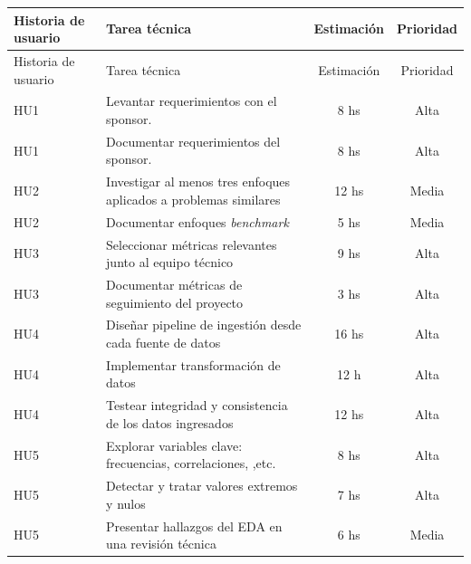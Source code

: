 \documentclass[
11pt, %
]{charter}
\begin{document}
\begin{longtable}{|p{2cm}|p{9cm}|c|c|}
\hline
\rowcolor[HTML]{C0C0C0}
Historia de usuario & Tarea técnica & Estimación & Prioridad \\ \hline
\endfirsthead

\hline
\rowcolor[HTML]{C0C0C0}
Historia de usuario & Tarea técnica & Estimación & Prioridad \\ \hline
\endhead

HU1 & Levantar requerimientos con el sponsor. & 8 hs & Alta \\ \hline
HU1 & Documentar requerimientos del sponsor. & 8 hs & Alta \\ \hline

HU2 & Investigar al menos tres enfoques aplicados a problemas similares & 12 hs & Media \\ \hline
HU2 & Documentar enfoques \textit{benchmark} & 5 hs & Media \\ \hline

HU3 & Seleccionar métricas relevantes junto al equipo técnico & 9 hs & Alta \\ \hline
HU3 & Documentar métricas de seguimiento del proyecto  & 3 hs & Alta \\ \hline

HU4 & Diseñar pipeline de ingestión desde cada fuente de datos & 16 hs & Alta \\ \hline
HU4 & Implementar transformación de datos  & 12 h & Alta \\ \hline
HU4 & Testear integridad y consistencia de los datos ingresados & 12 hs & Alta \\ \hline

HU5 & Explorar variables clave: frecuencias, correlaciones, ,etc. & 8 hs & Alta \\ \hline
HU5 & Detectar y tratar valores extremos y nulos & 7 hs & Alta \\ \hline
HU5 & Presentar hallazgos del EDA en una revisión técnica & 6 hs & Media \\ \hline


\end{longtable}
\end{document}
